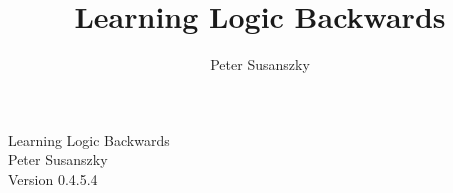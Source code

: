 \documentclass[12pt]{book}
\author{Peter Susanszky}
\title{Learning Logic Backwards}
\date{}
\begin{document}
\setcounter{page}{0}


\frontmatter

\noindent
Learning Logic Backwards\\
Peter Susanszky\\
Version 0.4.5.4
\doclicenseThis

\tableofcontents

\mainmatter










\end{document}
